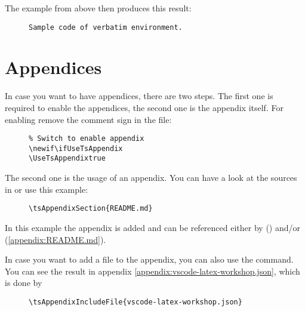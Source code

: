 The example from above then produces this result:

\begin{figure}[H]
    \small
    \centering
    \begin{BVerbatim}
Sample code of verbatim environment.
    \end{BVerbatim}
\end{figure}

\section{Appendices}

In case you want to have appendices, there are two steps. The first one is
required to enable the appendices, the second one is the appendix itself.
For enabling remove the comment sign in the 
file:

\begin{figure}[H]
    \small
    \centering
    \begin{BVerbatim}
\newif\ifUseTsAppendix
\UseTsAppendixtrue
    \end{BVerbatim}
\end{figure}

The second one is the usage of an appendix. You can have a look at the sources
in  or use this example:

\begin{figure}[H]
    \small
    \centering
    \begin{BVerbatim}
\tsAppendixSection{README.md}
    \end{BVerbatim}
\end{figure}

In this example the appendix  is added and can be
referenced either by 
() and/or
 (\ref{appendix:README.md}).
\bigbreak

In case you want to add a file to the appendix, you can also use the
 command.
You can see the result in appendix \ref{appendix:vscode-latex-workshop.json},
which is done by

\begin{figure}[H]
    \small
    \centering
    \begin{BVerbatim}
\tsAppendixIncludeFile{vscode-latex-workshop.json}
    \end{BVerbatim}
\end{figure}
